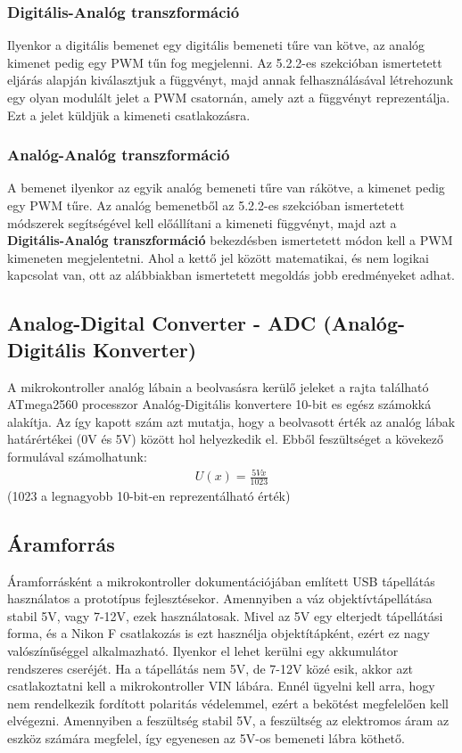 \subsubsection{Digitális-Analóg transzformáció}
Ilyenkor a digitális bemenet egy digitális bemeneti tűre van kötve, az analóg kimenet pedig egy PWM tűn fog megjelenni. Az 5.2.2-es szekcióban ismertetett eljárás alapján kiválasztjuk a függvényt, majd annak felhasználásával létrehozunk egy olyan modulált jelet a PWM csatornán, amely azt a függvényt reprezentálja. Ezt a jelet küldjük a kimeneti csatlakozásra.
\subsubsection{Analóg-Analóg transzformáció}
A bemenet ilyenkor az egyik analóg bemeneti tűre van rákötve, a kimenet pedig egy PWM tűre. Az analóg bemenetből az 5.2.2-es szekcióban ismertetett módszerek segítségével kell előállítani a kimeneti függvényt, majd azt a \textbf{Digitális-Analóg transzformáció} bekezdésben ismertetett módon kell a PWM kimeneten megjelentetni. Ahol a kettő jel között matematikai, és nem logikai kapcsolat van, ott az alábbiakban ismertetett megoldás jobb eredményeket adhat.
\subsection{Analog-Digital Converter - ADC (Analóg-Digitális Konverter)}
A mikrokontroller analóg lábain a beolvasásra kerülő jeleket a rajta található ATmega2560 processzor\cite{arduino_docs} Analóg-Digitális konvertere 10-bit es egész számokká alakítja\cite{ATmega_processor_datasheet}. Az így kapott szám azt mutatja, hogy a beolvasott érték az analóg lábak határértékei (0V és 5V) között hol helyezkedik el. Ebből feszültséget a kövekező formulával számolhatunk:
\begin{align}
    U(x) = \frac{5Vx}{1023}
\end{align}
\small (1023 a legnagyobb 10-bit-en reprezentálható érték)

\subsection{Áramforrás}
Áramforrásként a mikrokontroller dokumentációjában említett USB tápellátás használatos a prototípus fejlesztésekor.
Amennyiben a váz objektívtápellátása stabil 5V, vagy 7-12V, ezek használatosak.\cite{arduino_aram}
Mivel az 5V egy elterjedt tápellátási forma, és a Nikon F csatlakozás is ezt hasznélja objektítápként, ezért ez nagy valószínűséggel alkalmazható.
Ilyenkor el lehet kerülni egy akkumulátor rendszeres cseréjét.
Ha a tápellátás nem 5V, de 7-12V közé esik, akkor azt csatlakoztatni kell a mikrokontroller VIN lábára.
Ennél ügyelni kell arra, hogy nem rendelkezik fordított polaritás védelemmel, ezért a bekötést megfelelően kell elvégezni.\cite{arduino_docs}
Amennyiben a feszültség stabil 5V, a feszültség az elektromos áram az eszköz számára megfelel, így egyenesen az 5V-os bemeneti lábra köthető.

